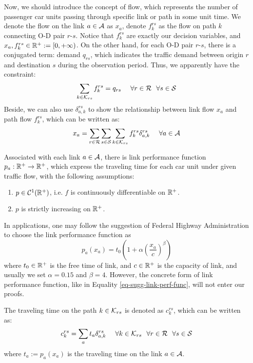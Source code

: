 \documentclass{article}
\begin{document}
Now, we should introduce the concept of flow, which represents the number of passenger car units passing through specific link or path in some unit time. We denote the flow on the link $ a \in \mathcal{A} $ as $ x_a $, denote $ f_k^{rs} $ as the flow on path $ k $ connecting O-D pair $ r $-$ s $. Notice that $ f_k^{rs} $ are exactly our decision variables, and $ x_a, f_k^{rs} \in \mathbb{R}^+ := [0, + \infty) $. On the other hand, for each O-D pair $ r $-$ s $, there is a conjugated term: demand $ q_{rs} $, which indicates the traffic demand between origin $ r $ and destination $ s $ during the observation period. Thus, we apparently have the constraint: 
$$ \sum_{k \in \mathcal{K}_{rs}} f_{k}^{rs} = q_{rs} ~~~~ \forall r \in \mathcal{R} ~~ \forall s \in \mathcal{S} $$
Beside, we can also use $ \delta_{a, k}^{rs} $ to show the relationship between link flow $ x_a $ and path flow $ f_k^{rs} $, which can be written as: 
\begin{equation} \label{eq-path-flow-to-link-flow}
    x_a = \sum_{r \in \mathcal{R}} \sum_{s \in \mathcal{S}} \sum_{k \in \mathcal{K}_{rs}} f_{k}^{rs} \delta_{a, k}^{rs} ~~~~ \forall a \in \mathcal{A}
\end{equation}

Associated with each link $ a \in \mathcal{A} $, there is link performance function $ p_a : \mathbb{R}^+ \rightarrow \mathbb{R}^+ $, which express the traveling time for each car unit under given traffic flow, with the following assumptions:
\begin{enumerate}
    \item $ p \in \mathcal{C}^1 (\mathbb{R}^+) $, i.e. $ f $ is continuously differentiable on $ \mathbb{R}^+ $.
    \item $ p $ is strictly increasing on $ \mathbb{R}^+ $.
\end{enumerate}

In applications, one may follow the suggestion of Federal Highway Administration to choose the link performance function as
\begin{equation} \label{eq-sugg-link-perf-func}
    p_a (x_a) = t_0 \left( 1 + \alpha \left( \frac{x_a}{c} \right)^\beta \right)
\end{equation}
where $ t_0 \in \mathbb{R}^+ $ is the free time of link, and $ c \in \mathbb{R}^+ $ is the capacity of link, and usually we set $ \alpha = 0.15 $ and $ \beta = 4 $. However, the concrete form of link performance function, like in Equality \ref{eq-sugg-link-perf-func}, will not enter our proofs.

The traveling time on the path $ k \in \mathcal{K}_{rs} $ is denoted as $ c_k^{rs} $, which can be written as: 
\begin{equation} \label{eq-link-time-to-path-time}
    c_k^{rs} = \sum_a t_a \delta_{a, k}^{rs} ~~~~ \forall k \in \mathcal{K}_{rs} ~~ \forall r \in \mathcal{R} ~~ \forall s \in \mathcal{S}
\end{equation}
where $ t_a := p_a (x_a) $ is the traveling time on the link $ a \in \mathcal{A} $.
\end{document}
